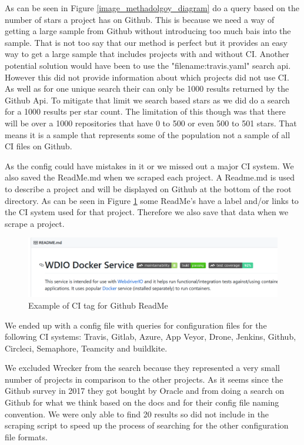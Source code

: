 \documentclass[twoside,12pt,titlepage,a4paper]{article}
\begin{document}
As can be seen in Figure \ref{image_methadolgoy_diagram} do a query based on the number of stars a project has on Github. This is because we need a way of getting a large sample from Github without introducing too much bais into the sample. That is not too say that our method is perfect but it provides an easy way to get a large sample that includes projects with and without CI.
Another potential solution would have been to use the "filename:travis.yaml" search api. However this did not provide information about which projects did not use CI. As well as for one unique search their can only be 1000 results returned by the Github Api. To mitigate that limit we search based stars as we did do a search for a 1000 results per star count. The limitation of this though was that there will be over a 1000 repositories that have 0 to 500 or even 500 to 501 stars. That means it is a sample that represents some of the population not a sample of all CI files on Github. 

As the config could have mistakes in it or we missed out a major CI system. We also saved the ReadMe.md when we scraped each project. A Readme.md is used to describe a project and will be displayed on Github at the bottom of the root directory. As can be seen in Figure \ref{ExampleGithubReadme} some ReadMe's have a label and/or links to the CI system used for that project. Therefore we also save that data when we scrape a project. 

\begin{figure}[h]
  \centering
  \includegraphics[scale=0.5, width=\textwidth]{2020-01-30-08-29-04.png}
  
  \caption[alt text]{Example of CI tag for Github ReadMe \cite{GithubReadMeExample}}
  \label{ExampleGithubReadme}
\end{figure}


We ended up with a config file with queries for configuration files for the following CI systems: Travis, Gitlab, Azure, App Veyor, Drone, Jenkins, Github, Circleci, Semaphore, Teamcity and buildkite. 

We excluded Wrecker from the search because they represented a very small number of projects in comparison to the other projects. As it seems since the Github survey in 2017 they got bought by Oracle and from doing a search on Github for what we think based on the docs \cite{WreckerDocs} and \cite{WreckerOpenSourceGithubSearch} for their config file naming convention. We were only able to find 20 results so did not include in the scraping script to speed up the process of searching for the other configuration file formats.
\end{document}
